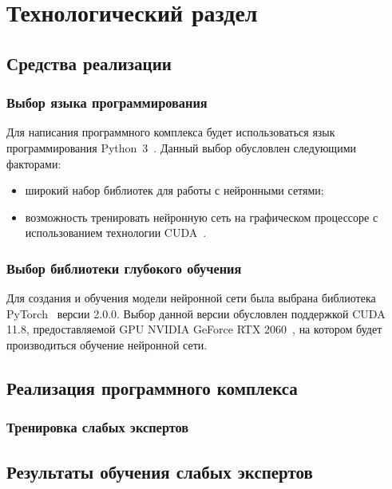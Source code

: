 \chapter{Технологический раздел}

\section{Средства реализации}

\subsection*{Выбор языка программирования}

Для написания программного комплекса будет использоваться язык программирования Python~3~\cite{python3}. Данный выбор обусловлен следующими факторами:
\begin{itemize}[label=---]
    \item широкий набор библиотек для работы с нейронными сетями;
    \item возможность тренировать нейронную сеть на графическом процессоре с
использованием технологии CUDA~\cite{cuda}.
\end{itemize}

\subsection*{Выбор библиотеки глубокого обучения}

Для создания и обучения модели нейронной сети была выбрана библиотека PyTorch~\cite{pytorch} версии 2.0.0. Выбор данной версии обусловлен поддержкой CUDA 11.8, предоставляемой GPU NVIDIA GeForce RTX 2060~\cite{rtx2060}, на котором будет производиться обучение нейронной сети.

\section{Реализация программного комплекса}

\subsection{Тренировка слабых экспертов}

\clearpage

\section{Результаты обучения слабых экспертов}

